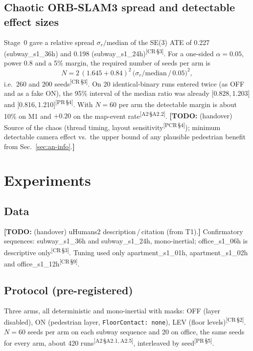 \documentclass[journal]{IEEEtran}
\newcommand{\TODO}[1]{{\color{red}\textbf{[TODO:} #1\textbf{]}}}
\newcommand{\src}[1]{\textsuperscript{\color{blue}\scriptsize[#1]}}
\begin{document}
\subsection{Chaotic ORB-SLAM3 spread and detectable effect sizes}
\label{sec:an-spread}
Stage~0 gave a relative spread $\sigma_r/\text{median}$ of the SE(3) ATE of
0.227 (subway\_s1\_36h) and 0.198 (subway\_s1\_24h)\src{CR\,\S3}. For a
one-sided $\alpha=0.05$, power 0.8 and a 5\% margin, the required number of
seeds per arm is
\begin{equation}
  N = 2\,(1.645+0.84)^2\,\bigl(\sigma_r/\text{median}\,/\,0.05\bigr)^2,
\end{equation}
i.e.\ 260 and 200 seeds\src{CR\,\S3}. On 20 identical-binary runs entered
twice (as OFF and as a fake ON), the 95\% interval of the median ratio was
already [0.828,\,1.203] and [0.816,\,1.210]\src{PR\,\S4}. With $N=60$ per arm
the detectable margin is about 10\% on M1 and $+0.20$ on the map-event
rate\src{A2\,\S A2.2}. \TODO{(handover) Source of the chaos (thread timing,
layout sensitivity\src{PCR\,\S4}); minimum detectable camera effect vs.\ the
upper bound of any plausible pedestrian benefit from
Sec.~\ref{sec:an-info}.}

\section{Experiments}
\label{sec:exp}

\subsection{Data}
\TODO{(handover) uHumans2 description\,/\,citation (from T1).}
Confirmatory sequences: subway\_s1\_36h and subway\_s1\_24h, mono-inertial;
office\_s1\_06h is descriptive only\src{CR\,\S3}. Tuning used only
apartment\_s1\_01h, apartment\_s1\_02h and office\_s1\_12h\src{CR\,\S9}.

\subsection{Protocol (pre-registered)}
Three arms, all deterministic and mono-inertial with masks: OFF (layer
disabled), ON (pedestrian layer, \texttt{FloorContact: none}), LEV (floor
levels)\src{CR\,\S2}. $N=60$ seeds per arm on each subway sequence and 20 on
office, the same seeds for every arm, about 420 runs\src{A2\,\S A2.1,\,A2.5},
interleaved by seed\src{PR\,\S5}.
\end{document}
